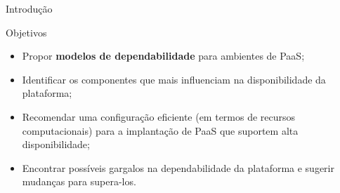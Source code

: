 \documentclass{beamer}
\begin{document}
    \begin{frame}{Introdução}
    
        Objetivos
        
        \begin{itemize}
        	\item Propor \textbf{modelos de dependabilidade} para ambientes de PaaS;
        \end{itemize}
        
        \begin{itemize}
        	\item Identificar os componentes que mais influenciam na disponibilidade da plataforma;
        \end{itemize}
        
        \begin{itemize}
        	\item Recomendar uma configuração eficiente (em termos de recursos computacionais) para a implantação de PaaS que suportem alta disponibilidade;
        \end{itemize}
        
        \begin{itemize}
        	\item Encontrar possíveis gargalos na dependabilidade da plataforma e sugerir mudanças para supera-los.
        \end{itemize}
    
    \end{frame}
    
\end{document}
